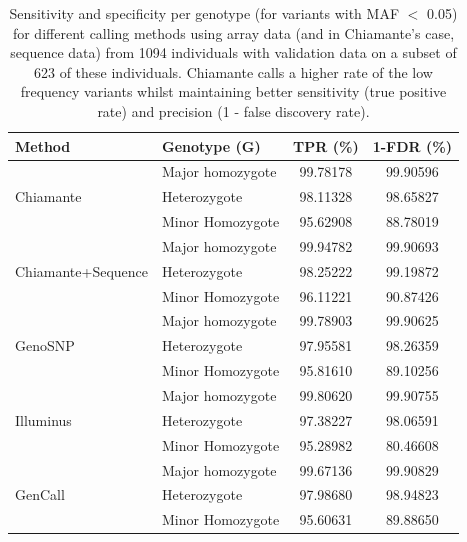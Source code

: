 \begin{table}
\begin{center}
\begin{tabular}{|ll|c|c|}
  \hline
 Method & Genotype (G) &TPR (\%) & 1-FDR (\%)\\
 \hline
          & Major homozygote   & 99.78178 & 99.90596 \\
 Chiamante& Heterozygote     & 98.11328 & 98.65827 \\
          & Minor Homozygote   & 95.62908 & 88.78019 \\
 \hline
                   & Major homozygote    & 99.94782 & 99.90693 \\
 Chiamante+Sequence& Heterozygote     & 98.25222 & 99.19872 \\
                   & Minor Homozygote       & 96.11221 & 90.87426 \\
 \hline   
          & Major homozygote    & 99.78903 & 99.90625 \\
 GenoSNP & Heterozygote    & 97.95581 & 98.26359 \\
          & Minor Homozygote    & 95.81610 & 89.10256 \\
 \hline
          & Major homozygote    & 99.80620 & 99.90755 \\
 Illuminus& Heterozygote      & 97.38227 & 98.06591 \\
          & Minor Homozygote    & 95.28982 & 80.46608 \\
\hline
        & Major homozygote        & 99.67136 & 99.90829 \\
 GenCall& Heterozygote     & 97.98680 & 98.94823 \\ 
        & Minor Homozygote      & 95.60631 & 89.88650 \\
 \hline

\end{tabular}
\caption[Genotype calling performance at low frequency SNPs]{Sensitivity and specificity per genotype (for variants with MAF $<$ 0.05) for different calling methods using array data (and in Chiamante's case, sequence data) from 1094 individuals with validation data on a subset of 623 of these individuals.  Chiamante calls a higher rate of the low frequency variants whilst maintaining better sensitivity (true positive rate) and precision (1 - false discovery rate).}
\label{1094tab4}
\end{center}
\end{table}

